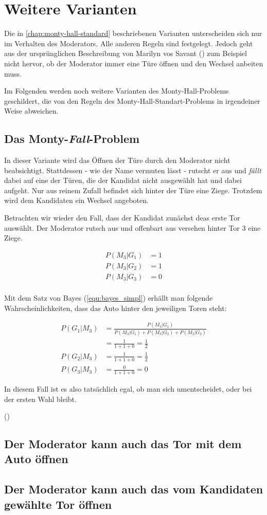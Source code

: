 \chapter{Weitere Varianten}

Die in \autoref{chap:monty-hall-standard} beschriebenen Varianten unterscheiden sich nur im Verhalten des Moderators. Alle anderen Regeln sind festgelegt.
Jedoch geht aus der ursprünglichen Beschreibung von Marilyn vos Savant (\cite{Savant:1990}) zum Beispiel nicht hervor, ob der Moderator immer eine Türe öffnen und den Wechsel anbeiten muss.

Im Folgenden werden noch weitere Varianten des Monty-Hall-Problems geschildert, die von den Regeln des Monty-Hall-Standart-Problems in irgendeiner Weise abweichen.

\section{Das Monty-\textit{Fall}-Problem}

In dieser Variante wird das Öffnen der Türe durch den Moderator nicht beabsichtigt. Stattdessen - wie der Name vermuten lässt - rutscht er aus und \textit{fällt} dabei auf eine der Türen, die der Kandidat nicht ausgewählt hat und dabei aufgeht. Nur aus reinem Zufall befindet sich hinter der Türe eine Ziege. Trotzdem wird dem Kandidaten ein Wechsel angeboten.

Betrachten wir wieder den Fall, dass der Kandidat zunächst deas erste Tor auswählt. Der Moderator rutsch aus und offenbart aus versehen hinter Tor 3 eine Ziege.

\begin{equation*}
    \begin{split}
        P(M_3|G_1) &= 1 \\
        P(M_3|G_2) &= 1 \\
        P(M_3|G_3) &= 0 \\
    \end{split}
\end{equation*}

Mit dem Satz von Bayes (\autoref{equ:bayes_simpl}) erhällt man folgende Wahrscheinlichkeiten, dass das Auto hinter den jeweiligen Toren steht:

\begin{equation}
    \begin{split}
        P(G_1|M_3) & = \frac{P(M_3|G_1)}{P(M_3|G_1) + P(M_3|G_2) + P(M_3|G_3)} \\
        & = \frac{1}{1+1+0} = \frac{1}{2} \\
        P(G_2|M_3) & = \frac{1}{1+1+0} = \frac{1}{2} \\
        P(G_3|M_3) & = \frac{0}{1+1+0} = 0
    \end{split}
\end{equation}

In diesem Fall ist es also tatsächlich egal, ob man sich umentscheidet, oder bei der ersten Wahl bleibt.

(\cite{Rosenthal:2008})

\section{Der Moderator kann auch das Tor mit dem Auto öffnen}
\section{Der Moderator kann auch das vom Kandidaten gewählte Tor öffnen}
